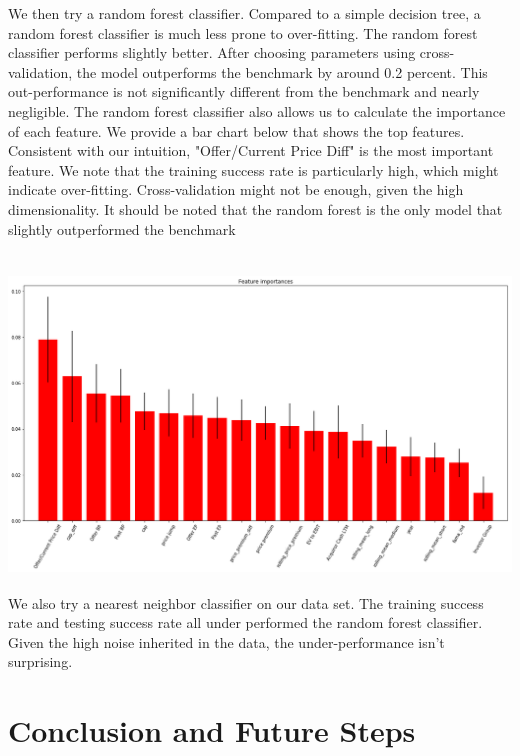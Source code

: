 \documentclass[12pt]{article}
\begin{document}
We then try a random forest classifier. Compared to a simple decision tree, a random forest classifier is much less prone to over-fitting. The random forest classifier performs slightly better. After choosing parameters using cross-validation, the model outperforms the benchmark by around 0.2 percent. This out-performance is not significantly different from the benchmark and nearly negligible. The random forest classifier also allows us to calculate the importance of each feature. We provide a bar chart below that shows the top features. Consistent with our intuition, "Offer/Current Price Diff" is the most important feature. We note that the training success rate is particularly high, which might indicate over-fitting. Cross-validation might not be enough, given the high dimensionality. It should be noted that the random forest is the only model that slightly outperformed the benchmark
\\
\\

\begin{center}
\includegraphics[width=14cm, height=8cm]{Feature_Importance.png} 

\end{center}

We also try a nearest neighbor classifier on our data set. The training success rate and testing success rate all under performed the random forest classifier. Given the high noise inherited in the data, the under-performance isn't surprising.




\section{Conclusion and Future Steps }
\label{sec:conclusion}
\end{document}
